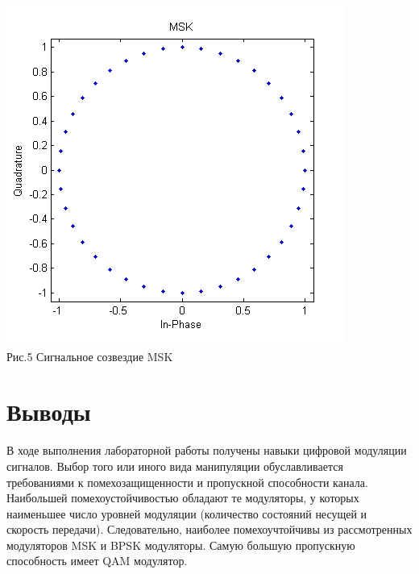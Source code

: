 \documentclass[a4paper]{article}
\begin{document}
\begin{center}
	\includegraphics[scale = 1]{msk.png} \\Рис.5 Сигнальное созвездие MSK
\end{center}

\section{Выводы}
В ходе выполнения лабораторной работы получены навыки цифровой модуляции сигналов. Выбор того или иного вида манипуляции обуславливается требованиями к помехозащищенности и пропускной способности канала. Наибольшей помехоустойчивостью обладают те модуляторы, у которых наименьшее число уровней модуляции (количество состояний несущей и скорость передачи). Следовательно, наиболее помехоучтойчивы из рассмотренных модуляторов MSK и BPSK модуляторы. Самую большую пропускную способность имеет QAM модулятор.  
\end{document}
